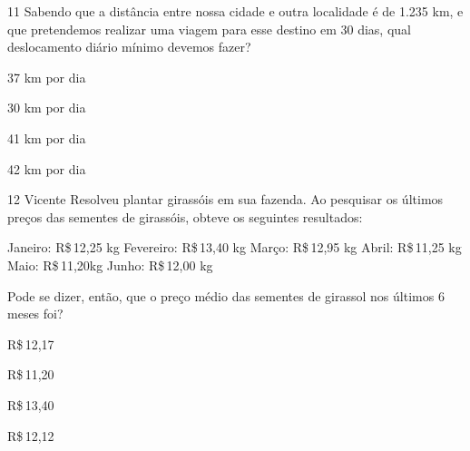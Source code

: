 
\num{11} Sabendo que a distância entre nossa cidade e outra localidade é de
1.235 km, e que pretendemos realizar uma viagem para esse destino em 30
dias, qual deslocamento diário mínimo devemos fazer?
\item 37 km por dia
\item 30 km por dia
\item 41 km por dia
\item 42 km por dia







\num{12} Vicente Resolveu plantar girassóis em sua fazenda. Ao pesquisar os
últimos preços das sementes de girassóis, obteve os seguintes
resultados:

Janeiro: R\$\,12,25 kg Fevereiro: R\$\,13,40 kg Março: R\$\,12,95 kg Abril:
R\$\,11,25 kg Maio: R\$\,11,20kg Junho: R\$\,12,00 kg

Pode se dizer, então, que o preço médio das sementes de girassol nos
últimos 6 meses foi?
\item R\$\,12,17
\item R\$\,11,20
\item R\$\,13,40
\item R\$\,12,12



